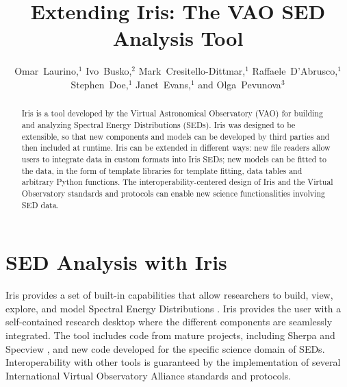 
\resetcounters




\title{Extending Iris: The VAO SED Analysis Tool}
\author{Omar~Laurino,$^{1}$ Ivo~Busko,$^2$ Mark~Cresitello-Dittmar,$^1$ Raffaele~D'Abrusco,$^1$ Stephen~Doe,$^1$ Janet~Evans,$^1$ and Olga~Pevunova$^3$
}


\begin{abstract}
Iris is a tool developed by the Virtual Astronomical Observatory (VAO) for building and analyzing Spectral Energy Distributions (SEDs). Iris was designed to be extensible, so that new components and models can be developed by third parties and then included at runtime. Iris can be extended in different ways: new file readers allow users to integrate data in custom formats into Iris SEDs; new models can be fitted to the data, in the form of template libraries for template fitting, data tables and arbitrary Python functions. The interoperability-centered design of Iris and the Virtual Observatory standards and protocols can enable new science functionalities involving SED data.
\end{abstract}

\section{SED Analysis with Iris}
Iris provides a set of built-in capabilities that allow researchers to build, view, explore, and model Spectral Energy Distributions \citep[SEDs;][]{2012ASPC..461..893D}. Iris provides the user with a self-contained research desktop where the different components are seamlessly integrated. The tool includes code from mature projects, including Sherpa \citep{2007ASPC..376..543D} and Specview \citep{2000ASPC..216...79B}, and new code developed for the specific science domain of SEDs.
Interoperability with other tools is guaranteed by the implementation of several International Virtual Observatory Alliance standards and protocols.


